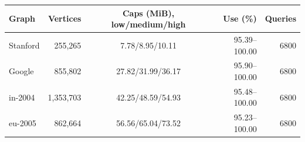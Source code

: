 \begin{tabular}{@{}lrcrr@{}}
\toprule
Graph & Vertices & Caps (MiB), low/medium/high & Use (\%) & Queries \\
\midrule
Stanford & 255,265 & 7.78/8.95/10.11 & 95.39--100.00 & 6800 \\
Google & 855,802 & 27.82/31.99/36.17 & 95.90--100.00 & 6800 \\
in-2004 & 1,353,703 & 42.25/48.59/54.93 & 95.48--100.00 & 6800 \\
eu-2005 & 862,664 & 56.56/65.04/73.52 & 95.23--100.00 & 6800 \\
\bottomrule
\end{tabular}

